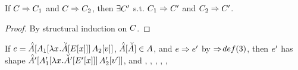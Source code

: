 \documentclass{article}
\begin{document}
\begin{lemma}
\label{lem:diamondC}
If $\C \pstep \C_1$ and $\C \pstep \C_2$, then $\exists \C'$ s.t. $\C_1 \pstep
\C'$ and $\C_2 \pstep \C'$.
\end{lemma}

\begin{proof}
  By structural induction on $\C$.
\end{proof}

\begin{lemma}
\label{lem:diamondhelp1}
If $\e = \inAp{\ap{\inA[_1]{\lx\inAm{\Ex}}}{\Av[_2]}}$, $\inAp{\Am}\in\A$, and
$\e \pstep \e'$ by $\pstep\!def(3)$, then $\e'$ has shape
$\inAp[']{\ap{\inA[_1']{\lx\inAm[']{\Ex[']}}}{\inA[_2']{\val'}}}$, and
\IH{\Ap}, , , \IH{\Am}, \IH{\E}, \IH{\val}
\end{lemma}
\end{document}
